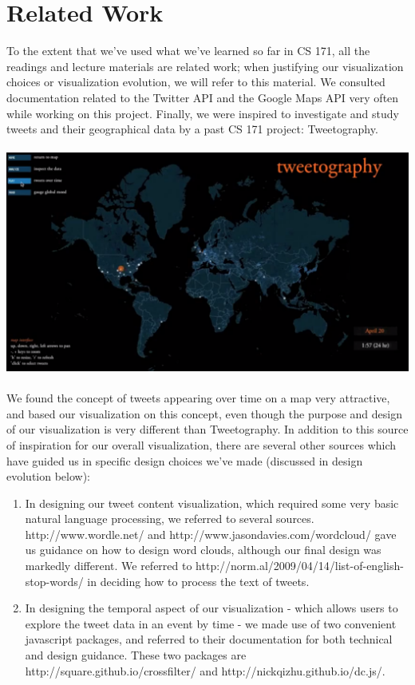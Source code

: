 \documentclass[pdftex,12pt,a4paper]{article}
\begin{document}
\section{Related Work}
To the extent that we've used what we've learned so far in CS 171, all the readings and lecture materials are related work; when justifying our visualization choices or visualization evolution, we will refer to this material. We consulted documentation related to the Twitter API and the Google Maps API very often while working on this project. Finally, we were inspired to investigate and study tweets and their geographical data by a past CS 171 project: Tweetography. \\ \\
\includegraphics[width=5.5in]{tweetography.png} \\ \\
We found the concept of tweets appearing over time on a map very attractive, and based our visualization on this concept, even though the purpose and design of our visualization is very different than Tweetography.
In addition to this source of inspiration for our overall visualization, there are several other sources which have guided us in specific design choices we've made (discussed in design evolution below):
\begin{enumerate}
\item In designing our tweet content visualization, which required some very basic natural language processing, we referred to several sources. \\ http://www.wordle.net/ and http://www.jasondavies.com/wordcloud/ gave us guidance on how to design word clouds, although our final design was markedly different. We referred to http://norm.al/2009/04/14/list-of-english-stop-words/ in deciding how to process the text of tweets.
\item In designing the temporal aspect of our visualization - which allows users to explore the tweet data in an event by time - we made use of two convenient javascript packages, and referred to their documentation for both technical and design guidance. These two packages are http://square.github.io/crossfilter/ and http://nickqizhu.github.io/dc.js/. 
\end{enumerate}
\end{document}
